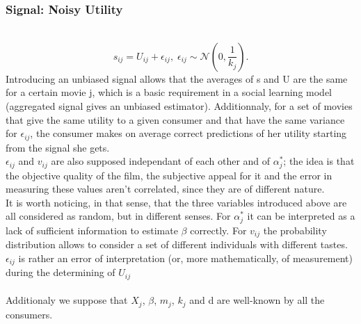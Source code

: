 	\subsubsection{Signal: Noisy Utility}
	\\
	\begin{equation*}
	s_{i j}=U_{i j}+\epsilon_{i j}, \;\epsilon_{i j}\sim \mathcal{N}(0,\frac{1}{k_{j}}).
	\end{equation*}
	Introducing an unbiased signal allows that the averages of s and U are the same for a certain movie j, which is a basic requirement in a social learning model (aggregated signal gives an unbiased estimator). Additionnaly, for a set of movies that give the same utility to a given consumer and that have the same variance for $\epsilon_{i j}$, the consumer makes on average correct predictions of her utility starting from the signal she gets. \\
	$\epsilon_{i j}$ and $v_{i j}$ are also supposed independant of each other and of $\alpha_{j}^{*}$; the idea is that the objective quality of the film, the subjective appeal for it and the error in measuring these values aren't correlated, since they are of different nature.\\
	It is worth noticing, in that sense, that the three variables introduced above are all considered as random, but in different senses. For  $\alpha_{j}^{*}$ it can be interpreted as a lack of sufficient information to estimate $\beta$ correctly. For $v_{i j}$ the probability distribution allows to consider a set of different individuals with different tastes. $\epsilon_{i j}$ is rather an error of interpretation (or, more mathematically, of measurement) during the determining of $U_{i j}$\\\\
	Additionaly we suppose that $X_{j}$, $\beta$, $m_{j}$, $k_{j}$ and d are well-known by all the consumers.
	\\
